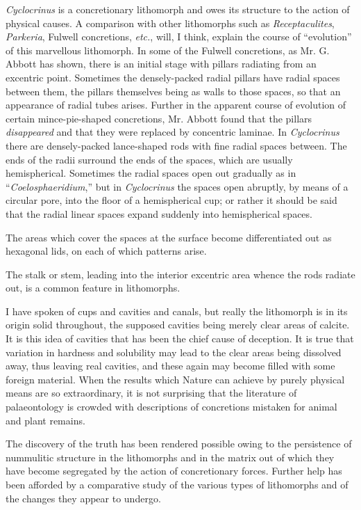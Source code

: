 \documentclass[a4paper, 12pt, oneside]{article}
\begin{document}
\emph{Cyclocrinus} is a concretionary lithomorph and owes its structure to the action of physical causes. A comparison with other lithomorphs such as \emph{Receptaculites}, \emph{Parkeria}, Fulwell concretions, \emph{etc.}, will, I think, explain the course of ``evolution'' of this marvellous lithomorph. In some of the Fulwell concretions, as Mr. G. Abbott has shown, there is an initial stage with pillars radiating from an excentric point. Sometimes the densely-packed radial pillars have radial spaces between them, the pillars themselves being as walls to those spaces, so that an appearance of radial tubes arises. Further in the apparent course of evolution of certain mince-pie-shaped concretions, Mr. Abbott found that the pillars \emph{disappeared} and that they were replaced by concentric laminae. In \emph{Cyclocrinus} there are densely-packed lance-shaped rods with fine radial spaces between. The ends of the radii surround the ends of the spaces, which are usually hemispherical. Sometimes the radial spaces open out gradually as in ``\emph{Coelosphaeridium},'' but in \emph{Cyclocrinus} the spaces open abruptly, by means of a circular pore, into the floor of a hemispherical cup; or rather it should be said that the radial linear spaces expand suddenly into hemispherical spaces.

The areas which cover the spaces at the surface become differentiated out as hexagonal lids, on each of which patterns arise.

The stalk or stem, leading into the interior excentric area whence the rods radiate out, is a common feature in lithomorphs.

I have spoken of cups and cavities and canals, but really the lithomorph is in its origin solid throughout, the supposed cavities being merely clear areas of calcite. It is this idea of cavities that has been the chief cause of deception. It is true that variation in hardness and solubility may lead to the clear areas being dissolved away, thus leaving real cavities, and these again may become filled with some foreign material. When the results which Nature can achieve by purely physical means are so extraordinary, it is not surprising that the literature of palaeontology is crowded with descriptions of concretions mistaken for animal and plant remains.

The discovery of the truth has been rendered possible owing to the persistence of nummulitic structure in the lithomorphs and in the matrix out of which they have become segregated by the action of concretionary forces. Further help has been afforded by a comparative study of the various types of lithomorphs and of the changes they appear to undergo.
\end{document}
